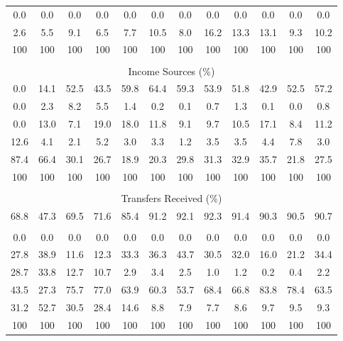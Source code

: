 \begin{tabular}{c c c| c c c c c| c c c| c}
0.0 & 0.0 & 0.0 & 0.0 & 0.0 & 0.0 & 0.0 & 0.0 & 0.0 & 0.0 & 0.0 & 0.0 \\
2.6 & 5.5 & 9.1 & 6.5 & 7.7 & 10.5 & 8.0 & 16.2 & 13.3 & 13.1 & 9.3 & 10.2 \\
\midrule
100 & 100 & 100 & 100 & 100 & 100 & 100 & 100 & 100 & 100 & 100 & 100 \\
\midrule \\
\multicolumn{12}{c}{Income Sources (\%)}  \\
\midrule
0.0 & 14.1 & 52.5 & 43.5 & 59.8 & 64.4 & 59.3 & 53.9 & 51.8 & 42.9 & 52.5 & 57.2 \\
0.0 & 2.3 & 8.2 & 5.5 & 1.4 & 0.2 & 0.1 & 0.7 & 1.3 & 0.1 & 0.0 & 0.8 \\
0.0 & 13.0 & 7.1 & 19.0 & 18.0 & 11.8 & 9.1 & 9.7 & 10.5 & 17.1 & 8.4 & 11.2 \\
12.6 & 4.1 & 2.1 & 5.2 & 3.0 & 3.3 & 1.2 & 3.5 & 3.5 & 4.4 & 7.8 & 3.0 \\
87.4 & 66.4 & 30.1 & 26.7 & 18.9 & 20.3 & 29.8 & 31.3 & 32.9 & 35.7 & 21.8 & 27.5 \\
\midrule
100 & 100 & 100 & 100 & 100 & 100 & 100 & 100 & 100 & 100 & 100 & 100 \\
\midrule \\
\multicolumn{12}{c}{Transfers Received (\%)}  \\
\midrule
68.8 & 47.3 & 69.5 & 71.6 & 85.4 & 91.2 & 92.1 & 92.3 & 91.4 & 90.3 & 90.5 & 90.7 \\
 & & & & & & & & & & &  \\
0.0 & 0.0 & 0.0 & 0.0 & 0.0 & 0.0 & 0.0 & 0.0 & 0.0 & 0.0 & 0.0 & 0.0 \\
27.8 & 38.9 & 11.6 & 12.3 & 33.3 & 36.3 & 43.7 & 30.5 & 32.0 & 16.0 & 21.2 & 34.4 \\
28.7 & 33.8 & 12.7 & 10.7 & 2.9 & 3.4 & 2.5 & 1.0 & 1.2 & 0.2 & 0.4 & 2.2 \\
43.5 & 27.3 & 75.7 & 77.0 & 63.9 & 60.3 & 53.7 & 68.4 & 66.8 & 83.8 & 78.4 & 63.5 \\
31.2 & 52.7 & 30.5 & 28.4 & 14.6 & 8.8 & 7.9 & 7.7 & 8.6 & 9.7 & 9.5 & 9.3 \\
\midrule
100 & 100 & 100 & 100 & 100 & 100 & 100 & 100 & 100 & 100 & 100 & 100 \\
\bottomrule
\end{tabular}
